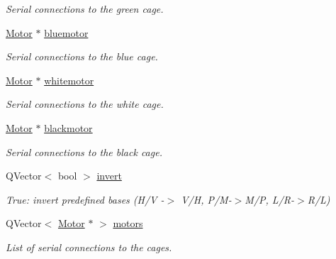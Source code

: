 \begin{DoxyCompactItemize}
\begin{DoxyCompactList}\small\item\em Serial connections to the green cage. \end{DoxyCompactList}\item 
\mbox{\label{classcagecontrol_a0b188226c1976ff8b89f4a043320c0d7}} 
\hyperlink{classMotor}{Motor} $\ast$ \hyperlink{classcagecontrol_a0b188226c1976ff8b89f4a043320c0d7}{bluemotor}
\begin{DoxyCompactList}\small\item\em Serial connections to the blue cage. \end{DoxyCompactList}\item 
\mbox{\label{classcagecontrol_ac345b05074401d11ce84f6e56a24538b}} 
\hyperlink{classMotor}{Motor} $\ast$ \hyperlink{classcagecontrol_ac345b05074401d11ce84f6e56a24538b}{whitemotor}
\begin{DoxyCompactList}\small\item\em Serial connections to the white cage. \end{DoxyCompactList}\item 
\mbox{\label{classcagecontrol_a4e5d64b7fc46495e7f1c8824ccb2b8d8}} 
\hyperlink{classMotor}{Motor} $\ast$ \hyperlink{classcagecontrol_a4e5d64b7fc46495e7f1c8824ccb2b8d8}{blackmotor}
\begin{DoxyCompactList}\small\item\em Serial connections to the black cage. \end{DoxyCompactList}\item 
\mbox{\label{classcagecontrol_a3a78cb0c0f45a8bb3e6b093ef7412124}} 
Q\+Vector$<$ bool $>$ \hyperlink{classcagecontrol_a3a78cb0c0f45a8bb3e6b093ef7412124}{invert}
\begin{DoxyCompactList}\small\item\em True\+: invert predefined bases (H/V -\/$>$ V/H, P/\+M-\/$>$M/P, L/\+R-\/$>$R/L) \end{DoxyCompactList}\item 
\mbox{\label{classcagecontrol_a8c4968b6ced27c21dafbc9c804e96ba0}} 
Q\+Vector$<$ \hyperlink{classMotor}{Motor} $\ast$ $>$ \hyperlink{classcagecontrol_a8c4968b6ced27c21dafbc9c804e96ba0}{motors}
\begin{DoxyCompactList}\small\item\em List of serial connections to the cages. \end{DoxyCompactList}\item 

\end{DoxyCompactItemize}
